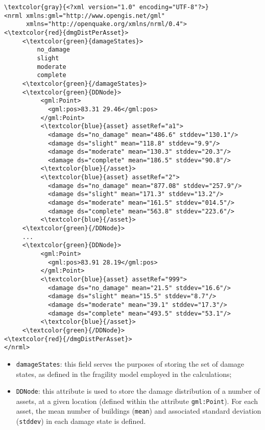 \begin{Verbatim}[frame=single, commandchars=\\\{\}, samepage=false]
\textcolor{gray}{<?xml version="1.0" encoding="UTF-8"?>}
<nrml xmlns:gml="http://www.opengis.net/gml"
      xmlns="http://openquake.org/xmlns/nrml/0.4">
<\textcolor{red}{dmgDistPerAsset}>
     <\textcolor{green}{damageStates}>
         no_damage
         slight
         moderate
         complete
     <\textcolor{green}{/damageStates}>
     <\textcolor{green}{DDNode}>
          <gml:Point>
            <gml:pos>83.31 29.46</gml:pos>
          </gml:Point>
          <\textcolor{blue}{asset} assetRef="a1">
            <damage ds="no_damage" mean="486.6" stddev="130.1"/>
            <damage ds="slight" mean="118.8" stddev="9.9"/>
            <damage ds="moderate" mean="130.3" stddev="20.3"/>
            <damage ds="complete" mean="186.5" stddev="90.8"/>
          <\textcolor{blue}{/asset}>
          <\textcolor{blue}{asset} assetRef="2">
            <damage ds="no_damage" mean="877.08" stddev="257.9"/>
            <damage ds="slight" mean="171.3" stddev="13.2"/>
            <damage ds="moderate" mean="161.5" stddev="014.5"/>
            <damage ds="complete" mean="563.8" stddev="223.6"/>
          <\textcolor{blue}{/asset}>
     <\textcolor{green}{/DDNode}>
     ...
     <\textcolor{green}{DDNode}>
          <gml:Point>
            <gml:pos>83.91 28.19</gml:pos>
          </gml:Point>
          <\textcolor{blue}{asset} assetRef="999">
            <damage ds="no_damage" mean="21.5" stddev="16.6"/>
            <damage ds="slight" mean="15.5" stddev="8.7"/>
            <damage ds="moderate" mean="39.1" stddev="17.3"/>
            <damage ds="complete" mean="493.5" stddev="53.1"/>
          <\textcolor{blue}{/asset}>
     <\textcolor{green}{/DDNode}>
<\textcolor{red}{/dmgDistPerAsset}>
</nrml>
\end{Verbatim}

\begin{itemize}
\item  \Verb+damageStates+: this field serves the purposes of storing the set of damage states, as defined in the \gls{fragility model} employed in the calculations;
\item  \Verb+DDNode+: this attribute is used to store the damage distribution of a number of \glspl{asset}, at a given location (defined within the attribute \Verb+gml:Point+). For each \gls{asset}, the mean number of buildings (\Verb+mean+) and associated standard deviation (\Verb+stddev+) in each damage state is defined.
\end{itemize}

